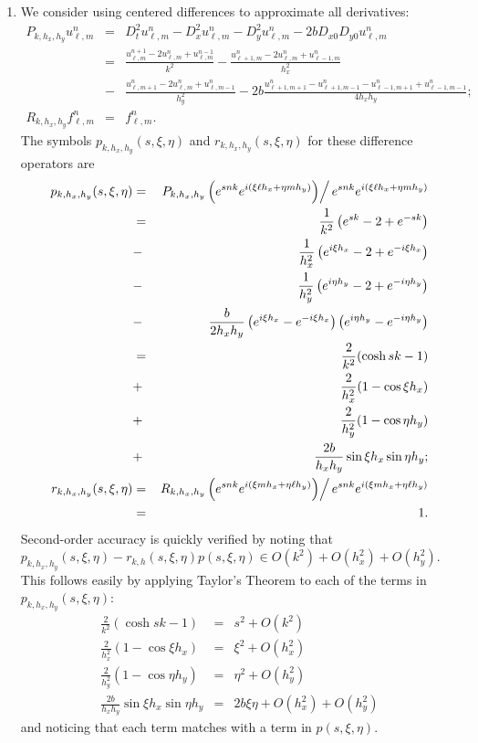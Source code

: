 \documentclass{article}
\begin{document}
\begin{enumerate}
\begin{enumerate}
\item We consider using centered differences to approximate all derivatives:
\begin{eqnarray*}
P_{k,h_x,h_y} u^n_{\ell,m}
& = & D_t^2 u^n_{\ell,m} - D_x^2 u^n_{\ell,m} - D_y^2 u^n_{\ell,m} - 2b D_{x0} D_{y0} u^n_{\ell,m} \\
& = & \frac{u^{n+1}_{\ell,m} - 2u^n_{\ell,m} + u^{n-1}_{\ell,m}}{k^2}
    - \frac{u^n_{\ell+1,m} - 2u^n_{\ell,m} + u^n_{\ell-1,m}}{h_x^2} \\
& - & \frac{u^n_{\ell,m+1} - 2u^n_{\ell,m} + u^n_{\ell,m-1}}{h_y^2}
    - 2b \frac{u^n_{\ell+1,m+1} - u^n_{\ell+1,m-1} - u^n_{\ell-1,m+1} + u^n_{\ell-1,m-1}}{4h_xh_y}; \\
R_{k,h_x,h_y} f^n_{\ell,m} & = & f^n_{\ell,m}.
\end{eqnarray*}
The symbols \(p_{k,h_x,h_y}(s,\xi,\eta)\) and \(r_{k,h_x,h_y}(s,\xi,\eta)\) for these difference operators are
\begin{eqnarray*}
p_{k,h_x,h_y}(s,\xi,\eta)
& = & \left. P_{k,h_x,h_y} \left( e^{snk} e^{i(\xi\ell h_x + \eta mh_y)} \right) \right/ e^{snk} e^{i(\xi\ell h_x + \eta mh_y)} \\
& = & \frac{1}{k^2} \left( e^{sk} - 2 + e^{-sk} \right) \\
& - & \frac{1}{h_x^2} \left( e^{i\xi h_x} - 2 + e^{-i\xi h_x} \right) \\
& - & \frac{1}{h_y^2} \left( e^{i\eta h_y} - 2 + e^{-i\eta h_y} \right) \\
& - & \frac{b}{2h_xh_y} \left( e^{i\xi h_x} - e^{-i\xi h_x} \right) \left( e^{i\eta h_y} - e^{-i\eta h_y} \right) \\
& = & \frac{2}{k^2} (\cosh sk - 1) \\
& + & \frac{2}{h_x^2} (1 - \cos \xi h_x) \\
& + & \frac{2}{h_y^2} (1 - \cos \eta h_y) \\
& + & \frac{2b}{h_xh_y} \sin \xi h_x \sin \eta h_y; \\
r_{k,h_x,h_y}(s,\xi,\eta)
& = & \left. R_{k,h_x,h_y} \left( e^{snk} e^{i(\xi mh_x + \eta \ell h_y)} \right) \right/ e^{snk} e^{i(\xi mh_x + \eta \ell h_y)} \\
& = & 1.
\end{eqnarray*}
Second-order accuracy is quickly verified by noting that \(p_{k,h_x,h_y}(s,\xi,\eta) - r_{k,h}(s,\xi,\eta) p(s,\xi,\eta) \in O(k^2) + O(h_x^2) + O(h_y^2)\).  This follows easily by applying Taylor's Theorem to each of the terms in \(p_{k,h_x,h_y}(s,\xi,\eta)\):
\begin{eqnarray*}
\frac{2}{k^2} (\cosh sk - 1) & = & s^2 + O(k^2) \\
\frac{2}{h_x^2} (1 - \cos \xi h_x) & = & \xi^2 + O(h_x^2) \\
\frac{2}{h_y^2} (1 - \cos \eta h_y) & = & \eta^2 + O(h_y^2) \\
\frac{2b}{h_xh_y} \sin \xi h_x \sin \eta h_y & = & 2b\xi\eta + O(h_x^2) + O(h_y^2)
\end{eqnarray*}
and noticing that each term matches with a term in \(p(s,\xi,\eta)\).


\end{enumerate}
\end{enumerate}
\end{document}
